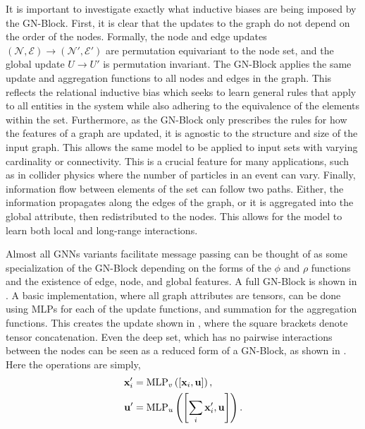 It is important to investigate exactly what inductive biases are being imposed by the GN-Block.
First, it is clear that the updates to the graph do not depend on the order of the nodes.
Formally, the node and edge updates $(\mathcal{N}, \mathcal{E}) \rightarrow (\mathcal{N}', \mathcal{E}')$ are permutation equivariant to the node set, and the global update $U \rightarrow U'$ is permutation invariant.
The GN-Block applies the same update and aggregation functions to all nodes and edges in the graph.
This reflects the relational inductive bias which seeks to learn general rules that apply to all entities in the system while also adhering to the equivalence of the elements within the set.
Furthermore, as the GN-Block only prescribes the rules for how the features of a graph are updated, it is agnostic to the structure and size of the input graph.
This allows the same model to be applied to input sets with varying cardinality or connectivity.
This is a crucial feature for many applications, such as in collider physics where the number of particles in an event can vary.
Finally, information flow between elements of the set can follow two paths.
Either, the information propagates along the edges of the graph, or it is aggregated into the global attribute, then redistributed to the nodes.
This allows for the model to learn both local and long-range interactions.

Almost all GNNs variants facilitate message passing can be thought of as some specialization of the GN-Block depending on the forms of the $\phi$ and $\rho$ functions and the existence of edge, node, and global features.
A full GN-Block is shown in .
A basic implementation, where all graph attributes are tensors, can be done using MLPs for each of the update functions, and summation for the aggregation functions.
This creates the update shown in , where the square brackets denote tensor concatenation.
Even the deep set, which has no pairwise interactions between the nodes can be seen as a reduced form of a GN-Block, as shown in .
Here the operations are simply,
\begin{align}
    \mathbf{x}_i' &= \text{MLP}_v\left(\left[\mathbf{x}_i, \mathbf{u}\right]\right),\\
    \mathbf{u}' &= \text{MLP}_u\left(\left[\sum_{i} \mathbf{x}_i', \mathbf{u}\right]\right).
\end{align}

